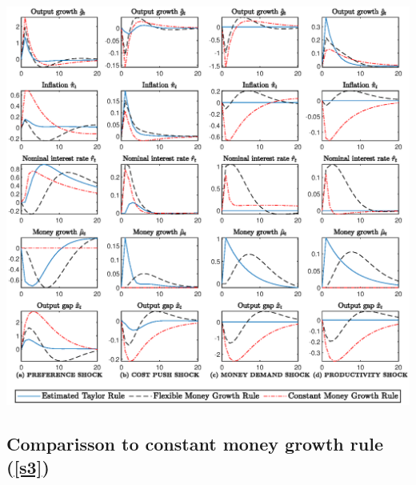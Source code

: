 \documentclass[11pt,preprint, authoryear]{elsarticle}
\let\origfigure\figure
\let\endorigfigure\endfigure
\renewenvironment{figure}[1][2] {
    \expandafter\origfigure\expandafter[H]
} {
    \endorigfigure
}
\numberwithin{equation}{section}
\numberwithin{figure}{section}
\numberwithin{table}{section}
\begin{document}
\begin{figure}
  \centering
  \hspace*{-2cm}  
  \includegraphics[width=1.2\textwidth]{code/final_irf_grid.eps}
  \caption{Impulse responses to the indicated shock under the benchmark sample. Each column shows the percentage-point response of the indicated variable to a one-standard-deviation $\sigma_i$,for $i=a_t, z_t, u_t, e_t$, under the estimated Taylor rule (\ref{s1}), the flexible money growth rule (\ref{s2}),and the constant money growth rule (\ref{s3}).}
  \label{irf1}
\end{figure}

\hypertarget{comparisson-to-constant-money-growth-rule}{%
\subsection{\texorpdfstring{Comparisson to constant money growth rule
(\ref{s3})}{Comparisson to constant money growth rule ()}}\label{comparisson-to-constant-money-growth-rule}}
\end{document}
